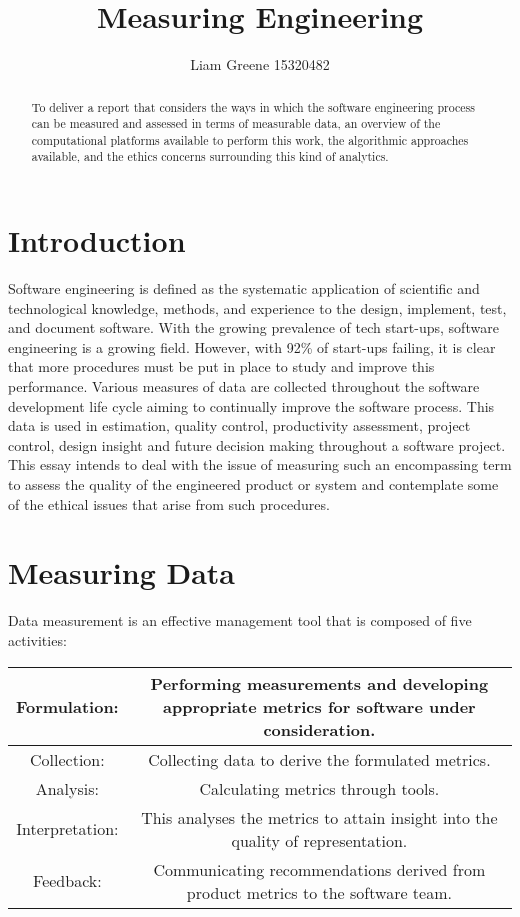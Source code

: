 \documentclass{article}
\begin{document}
\title{Measuring Engineering} \author{Liam Greene 15320482}

\maketitle

\begin{abstract} To deliver a report that considers the ways in which the software engineering process can be measured and assessed in terms of measurable data, an overview of the computational platforms available to perform this work, the algorithmic approaches available, and the ethics concerns surrounding this kind of analytics. \end{abstract}

\section{Introduction} Software engineering is defined as the systematic application of scientific and technological knowledge, methods, and experience to the design, implement, test, and document software.\cite{def} With the growing prevalence of tech start-ups, software engineering is a growing field. However, with 92\% of start-ups failing\cite{startup}, it is clear that more procedures must be put in place to study and improve this performance. Various measures of data are collected throughout the software development life cycle aiming to continually improve the software process. This data is used in estimation, quality control, productivity assessment, project control, design insight and future decision making throughout a software project. This essay intends to deal with the issue of measuring such an encompassing term to assess the quality of the engineered product or system and contemplate some of the ethical issues that arise from such procedures.

\section{Measuring Data} Data measurement is an effective management tool that is composed of five activities: \cite{fcaif} \newline

\hspace*{-3.5cm}
\begin{tabular}{||c c||} 
\hline
Formulation: & Performing measurements and developing appropriate metrics for software under consideration. \\ 
\hline
Collection: & Collecting data to derive the formulated metrics. \\ 
\hline
Analysis: & Calculating metrics through tools. \\
\hline
Interpretation: & This analyses the metrics to attain insight into the quality of representation. \\
\hline
Feedback: & Communicating recommendations derived from product metrics to the software team. \\
\hline
\end{tabular}
\end{document}
